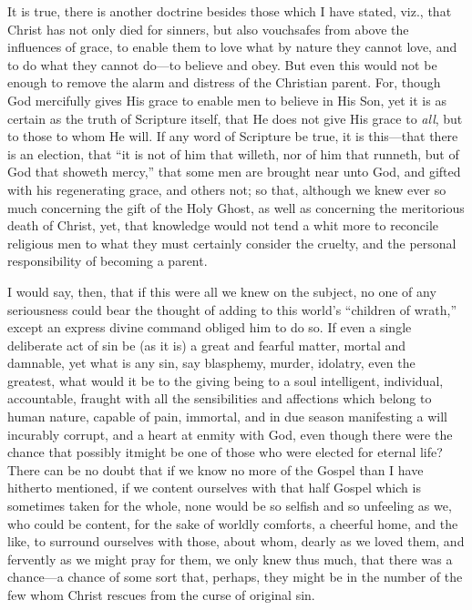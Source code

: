It is true, there is another doctrine besides those which I have
stated, viz., that Christ has not only died for sinners, but also
vouchsafes from above the influences of grace, to enable them to love
what by nature they cannot love, and to do what they cannot do—to
believe and obey. But even this would not be enough to remove the
alarm and distress of the Christian parent. For, though God mercifully
gives His grace to enable men to believe in His Son, yet it is as
certain as the truth of Scripture itself, that He does not give His
grace to \emph{all}, but to those to whom He will. If any word of
Scripture be true, it is this—that there is an election, that
``it is not of him that willeth, nor of him that runneth, but of
God that showeth mercy,'' that some men are brought near unto God,
and gifted with his regenerating grace, and others not; so that,
although we knew ever so much concerning the gift of the Holy Ghost,
as well as concerning the meritorious death of Christ, yet, that
knowledge would not tend a whit more to reconcile religious men to
what they must certainly consider the cruelty, and the personal
responsibility of becoming a parent.

I would say, then, that if this were all we knew on the subject, no
one of any seriousness could bear the thought of adding to this world's
``children of wrath,'' except an express divine command
obliged him to do so. If even a single deliberate act of sin be (as it
is) a great and fearful matter, mortal and damnable, yet what is any
sin, say blasphemy, murder, idolatry, even the greatest, what would it
be to the giving being to a soul intelligent, individual, accountable,
fraught with all the sensibilities and affections which belong to
human nature, capable of pain, immortal, and in due season manifesting
a will incurably corrupt, and a heart at enmity with God, even though
there were the chance that possibly it\emph{}might be one of those
who were elected for eternal life? There can be no doubt that if we
know no more of the Gospel than I have hitherto mentioned, if we
content ourselves with that half Gospel which is sometimes taken for
the whole, none would be so selfish and so unfeeling as we, who could
be content, for the sake of worldly comforts, a cheerful home, and the
like, to surround ourselves with those, about whom, dearly as we loved
them, and fervently as we might pray for them, we only knew thus much,
that there was a chance—a chance of some sort that, perhaps, they
might be in the number of the few whom Christ rescues from the curse
of original sin.

